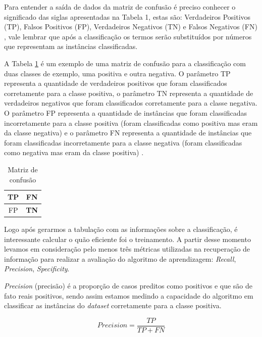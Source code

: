 Para entender a saída de dados da matriz de confusão é preciso conhecer o significado das siglas apresentadas na Tabela 1, estas são: Verdadeiros Positivos (TP), Falsos Positivos (FP), Verdadeiros Negativos (TN) e Falsos Negativos (FN) \cite{Powers2011}, vale lembrar que após a classificação os termos serão substituídos por números que representam as instâncias classificadas.

A Tabela \ref{tab:confusion} é um exemplo de uma matriz de confusão para a classificação com duas classes de exemplo, uma positiva e outra negativa. O parâmetro TP representa a quantidade de verdadeiros positivos que foram classificados corretamente para a  classe positiva, o parâmetro TN representa a quantidade de verdadeiros negativos que foram classificados corretamente para a classe negativa. O parâmetro FP representa a quantidade de instâncias que foram classificadas incorretamente para a classe positiva (foram classificadas como positiva mas eram da classe negativa) e o parâmetro FN representa a quantidade de instâncias que foram classificadas incorretamente para a classe negativa (foram classificadas como negativa mas eram da classe positiva) \cite{Powers2011}.

\begin{table}[h]
	\caption{\label{tab:confusion}Matriz de confusão}
	\begin{center}
	\begin{tabular}{c|c}
		\hline 
		\textbf{TP} & FN \\ 
		\hline
		FP & \textbf{TN} \\ 
		\hline 
	\end{tabular} 
	\end{center}
\end{table}

Logo após gerarmos a tabulação com as informações sobre a classificação, é  interessante calcular o quão eficiente foi o treinamento. A partir desse momento levamos em consideração pelo menos três métricas utilizadas na recuperação de informação \cite{Buttcher2016} para realizar a avaliação do algoritmo de aprendizagem: \textit{Recall}, \textit{Precision}, \textit{Specificity}.

\textit{Precision} (precisão) é a proporção de casos preditos como positivos e que são de fato reais positivos, sendo assim estamos medindo a capacidade do algoritmo em classificar as instâncias do \textit{dataset} corretamente para a classe positiva.

\begin{equation}
Precision  = \frac{TP}{TP + FN}
\end{equation}

